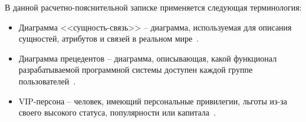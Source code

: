 
В данной расчетно-пояснительной записке применяется следующая терминология:
\begin{itemize}[label=]
	\item Диаграмма <<сущность-связь>> -- диаграмма, используемая для описания сущностей, атрибутов и связей в реальном мире~\cite{lit5}.
	\item Диаграмма прецедентов -- диаграмма, описывающая, какой функционал разрабатываемой программной системы доступен каждой группе пользователей~\cite{lit9}.
	\item VIP-персона -- человек, имеющий персональные привилегии, льготы из-за своего высокого статуса, популярности или капитала~\cite{lit6}. 
\end{itemize}

\clearpage
